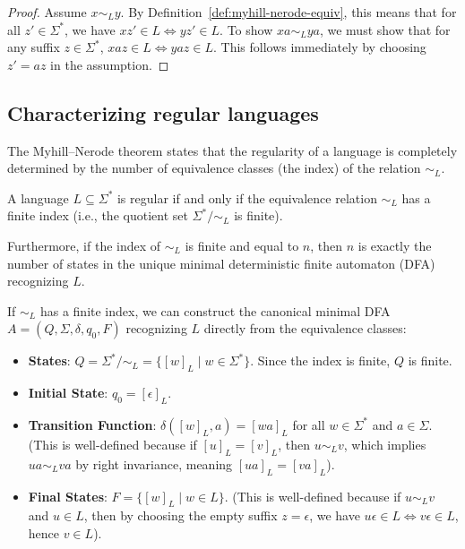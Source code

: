 \begin{proof}
Assume $x \sim_L y$. By Definition~\ref{def:myhill-nerode-equiv}, this means that for all $z' \in \Sigma^*$, we have $xz' \in L \iff yz' \in L$. To show $xa \sim_L ya$, we must show that for any suffix $z \in \Sigma^*$, $xaz \in L \iff yaz \in L$. This follows immediately by choosing $z' = az$ in the assumption.
\end{proof}

\subsection{Characterizing regular languages}

The Myhill--Nerode theorem states that the regularity of a language is completely determined by the number of equivalence classes (the index) of the relation $\sim_L$.

\begin{theorem}
\label{thm:myhill-nerode-learning}
A language $L \subseteq \Sigma^*$ is regular if and only if the equivalence relation $\sim_L$ has a finite index (i.e., the quotient set $\Sigma^*/{\sim_L}$ is finite).
\end{theorem}

Furthermore, if the index of $\sim_L$ is finite and equal to $n$, then $n$ is exactly the number of states in the unique minimal deterministic finite automaton (DFA) recognizing $L$.

\begin{formaldetails}
If $\sim_L$ has a finite index, we can construct the canonical minimal DFA $A = (Q, \Sigma, \delta, q_0, F)$ recognizing $L$ directly from the equivalence classes:
\begin{itemize}
  \item \textbf{States}: $Q = \Sigma^*/{\sim_L} = \{[w]_L \mid w \in \Sigma^*\}$. Since the index is finite, $Q$ is finite.
  \item \textbf{Initial State}: $q_0 = [\epsilon]_L$.
  \item \textbf{Transition Function}: $\delta([w]_L, a) = [wa]_L$ for all $w \in \Sigma^*$ and $a \in \Sigma$. (This is well-defined because if $[u]_L = [v]_L$, then $u \sim_L v$, which implies $ua \sim_L va$ by right invariance, meaning $[ua]_L = [va]_L$).
  \item \textbf{Final States}: $F = \{[w]_L \mid w \in L\}$. (This is well-defined because if $u \sim_L v$ and $u \in L$, then by choosing the empty suffix $z = \epsilon$, we have $u\epsilon \in L \iff v\epsilon \in L$, hence $v \in L$).
\end{itemize}
\end{formaldetails}

